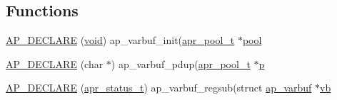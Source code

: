 \subsection*{Functions}
\begin{DoxyCompactItemize}
\item 
\hyperlink{group__APACHE__CORE__VARBUF_gab3597b249f22886ab1132a4c7ea31fd8}{A\+P\+\_\+\+D\+E\+C\+L\+A\+RE} (\hyperlink{group__MOD__ISAPI_gacd6cdbf73df3d9eed42fa493d9b621a6}{void}) ap\+\_\+varbuf\+\_\+init(\hyperlink{structapr__pool__t}{apr\+\_\+pool\+\_\+t} $\ast$\hyperlink{group__APR__XLATE_gabb3cd978f04c73d0b763c391e9bfde73}{pool}
\item 
\hyperlink{group__APACHE__CORE__VARBUF_ga842968b36c8be0c78786ed80d8c21783}{A\+P\+\_\+\+D\+E\+C\+L\+A\+RE} (char $\ast$) ap\+\_\+varbuf\+\_\+pdup(\hyperlink{structapr__pool__t}{apr\+\_\+pool\+\_\+t} $\ast$\hyperlink{group__APACHE__CORE__MPM_ga5cd91701e5c167f2b1a38e70ab57817e}{p}
\item 
\hyperlink{group__APACHE__CORE__VARBUF_ga9ff0a502abdb8548983c5c1aef67fd2c}{A\+P\+\_\+\+D\+E\+C\+L\+A\+RE} (\hyperlink{group__apr__errno_gaa5105fa83cc322f09382292db8b47593}{apr\+\_\+status\+\_\+t}) ap\+\_\+varbuf\+\_\+regsub(struct \hyperlink{structap__varbuf}{ap\+\_\+varbuf} $\ast$\hyperlink{group__APACHE__CORE__VARBUF_ga29f1d61bf61bdf84c1b79497ddbe762d}{vb}
\end{DoxyCompactItemize}
